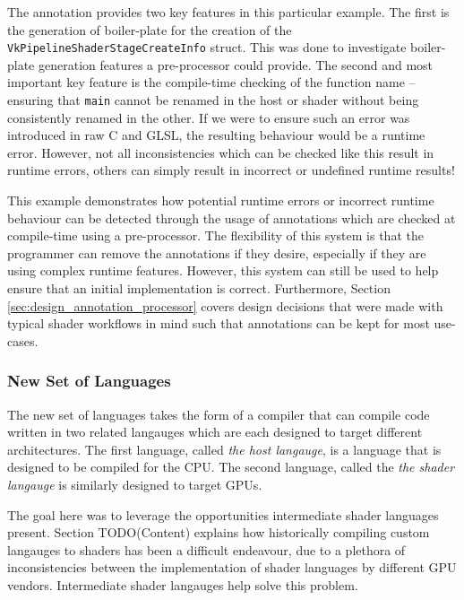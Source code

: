 \documentclass[a4paper,12pt,twoside,openright]{report}
\begin{document}
The annotation provides two key features in this particular example. The first
is the generation of boiler-plate for the creation of the
\texttt{VkPipelineShaderStageCreateInfo} struct. This was done to investigate
boiler-plate generation features a pre-processor could provide. The second and
most important key feature is the compile-time checking of the function name --
ensuring that \texttt{main} cannot be renamed in the host or shader without
being consistently renamed in the other. If we were to ensure such an error was
introduced in raw C and GLSL, the resulting behaviour would be a runtime error.
However, not all inconsistencies which can be checked like this result in
runtime errors, others can simply result in incorrect or undefined runtime
results!

This example demonstrates how potential runtime errors or incorrect runtime
behaviour can be detected through the usage of annotations which are checked at
compile-time using a pre-processor. The flexibility of this system is that the
programmer can remove the annotations if they desire, especially if they are
using complex runtime features. However, this system can still be used to help
ensure that an initial implementation is correct. Furthermore, Section
\ref{sec:design_annotation_processor} covers design decisions that were made
with typical shader workflows in mind such that annotations can be kept for
most use-cases.

\subsubsection{New Set of Languages}

The new set of languages takes the form of a compiler that can compile code
written in two related langauges which are each designed to target different
architectures. The first language, called \textit{the host langauge}, is a
language that is designed to be compiled for the CPU. The second language,
called the \textit{the shader langauge} is similarly designed to target GPUs.

The goal here was to leverage the opportunities intermediate shader languages
present. Section TODO(Content) explains how historically compiling custom langauges to
shaders has been a difficult endeavour, due to a plethora of inconsistencies
between the implementation of shader languages by different GPU vendors.
Intermediate shader langauges help solve this problem.

\end{document}
